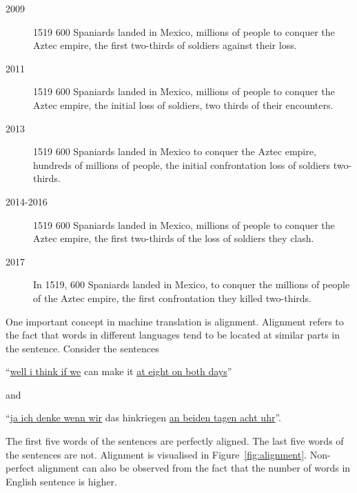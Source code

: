 \begin{description}
    \item[2009] 1519 600 Spaniards landed in Mexico, millions of people to conquer the Aztec empire, the first two-thirds of soldiers against their loss.
    \item[2011] 1519 600 Spaniards landed in Mexico, millions of people to conquer the Aztec empire, the initial loss of soldiers, two thirds of their encounters.
    \item[2013] 1519 600 Spaniards landed in Mexico to conquer the Aztec empire, hundreds of millions of people, the initial confrontation loss of soldiers two-thirds.
    \item[2014-2016] 1519 600 Spaniards landed in Mexico, millions of people to conquer the Aztec empire, the first two-thirds of the loss of soldiers they clash.
    \item[2017] In 1519, 600 Spaniards landed in Mexico, to conquer the millions of people of the Aztec empire, the first confrontation they killed two-thirds.
\end{description}

One important concept in machine translation is alignment.
Alignment refers to the fact that words in different languages tend to be located at similar parts in the sentence.
Consider the sentences

\begin{center}
    ``\underline{well i think if we} can make it \underline{at eight on both days}''
\end{center}
and
\begin{center}
    ``\underline{ja ich denke wenn wir} das hinkriegen \underline{an beiden tagen acht uhr}''.
\end{center}
\vspace*{1mm}
The first five words of the sentences are perfectly aligned.
The last five words of the sentences are not.
Alignment is visualised in Figure~\ref{fig:alignment}.
Non-perfect alignment can also be observed from the fact that the number of words in English sentence is higher.

